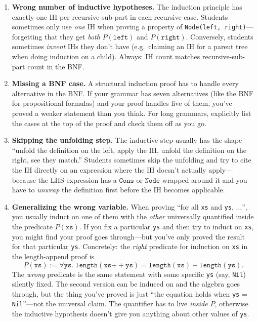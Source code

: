 \documentclass[11pt]{article}
\begin{document}
\begin{enumerate}
  \item \textbf{Wrong number of inductive hypotheses.} The induction principle has exactly one IH per recursive sub-part in each recursive case. Students sometimes only use \emph{one} IH when proving a property of \texttt{Node(left, right)}---forgetting that they get \emph{both} $P(\texttt{left})$ and $P(\texttt{right})$. Conversely, students sometimes \emph{invent} IHs they don't have (e.g.\ claiming an IH for a parent tree when doing induction on a child). Always: IH count matches recursive-sub-part count in the BNF.
  \item \textbf{Missing a BNF case.} A structural induction proof has to handle every alternative in the BNF. If your grammar has seven alternatives (like the BNF for propositional formulas) and your proof handles five of them, you've proved a weaker statement than you think. For long grammars, explicitly list the cases at the top of the proof and check them off as you go.
  \item \textbf{Skipping the unfolding step.} The inductive step usually has the shape ``unfold the definition on the left, apply the IH, unfold the definition on the right, see they match.'' Students sometimes skip the unfolding and try to cite the IH directly on an expression where the IH doesn't actually apply---because the LHS expression has a $\texttt{Cons}$ or $\texttt{Node}$ wrapped around it and you have to \emph{unwrap} the definition first before the IH becomes applicable.
  \item \textbf{Generalizing the wrong variable.} When proving ``for all \texttt{xs} and \texttt{ys}, $\ldots$'', you usually induct on one of them with the \emph{other} universally quantified inside the predicate $P(\texttt{xs})$. If you fix a particular \texttt{ys} and then try to induct on \texttt{xs}, you might find your proof goes through---but you've only proved the result for that particular \texttt{ys}. Concretely: the \emph{right} predicate for induction on \texttt{xs} in the length-append proof is
\[
  P(\texttt{xs}) := \forall \texttt{ys}.\; \texttt{length}(\texttt{xs} \mathbin{++} \texttt{ys}) = \texttt{length}(\texttt{xs}) + \texttt{length}(\texttt{ys}).
\]
The \emph{wrong} predicate is the same statement with some specific \texttt{ys} (say, \texttt{Nil}) silently fixed. The second version can be induced on and the algebra goes through, but the thing you've proved is just ``the equation holds when \texttt{ys} = \texttt{Nil}''---not the universal claim. The quantifier has to live \emph{inside} $P$, otherwise the inductive hypothesis doesn't give you anything about other values of \texttt{ys}.

\end{enumerate}
\end{document}
